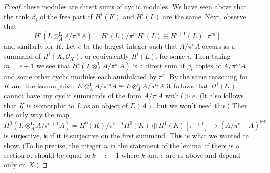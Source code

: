 \documentclass{amsart}
\theoremstyle{plain}
\theoremstyle{definition}
\theoremstyle{remark}
\numberwithin{equation}{subsection}
\begin{document}
\begin{proof}
these modules are direct sums of cyclic modules.
We have seen above that the rank $\beta_i$ of the
free part of $H^i(K)$ and $H^i(L)$ are the same.
Next, observe that
$$
H^i(L \otimes_A^\mathbf{L} A/\pi^m A) =
H^i(L)/\pi^m H^i(L) \oplus H^{i + 1}(L)[\pi^m]
$$
and similarly for $K$. Let $e$ be the largest integer
such that $A/\pi^eA$ occurs as a summand of $H^i(X, \mathcal{O}_X)$,
or equivalently $H^i(L)$, for some $i$. Then taking $m = e + 1$
we see that $H^i(L \otimes_A^\mathbf{L} A/\pi^m A)$ is a direct sum of
$\beta_i$ copies of $A/\pi^m A$ and some other cyclic modules
each annihilated by $\pi^e$. By the same reasoning for $K$
and the isomorphism
$K \otimes_A^\mathbf{L} A/\pi^m A \cong L \otimes_A^\mathbf{L} A/\pi^m A$
it follows that $H^i(K)$
cannot have any cyclic summands of the form $A/\pi^l A$
with $l > e$. (It also follows that $K$ is isomorphic to $L$
as an object of $D(A)$, but we won't need this.)
Then the only way the map
$$
H^0(K \otimes^\mathbf{L}_A A/\pi^{e + 1} A) =
H^0(K)/\pi^{e + 1}H^0(K) \oplus H^1(K)[\pi^{e + 1}]
\longrightarrow
(A/\pi^{e + 1} A)^{\oplus r}
$$
is surjective, is if it is surjective on the
first summand. This is what we wanted to show.
(To be precise, the integer $n$ in the statement of
the lemma, if there is a section $\sigma$,
should be equal to $k + e + 1$ where $k$ and $e$ are as above
and depend only on $X$.)
\end{proof}
\end{document}
